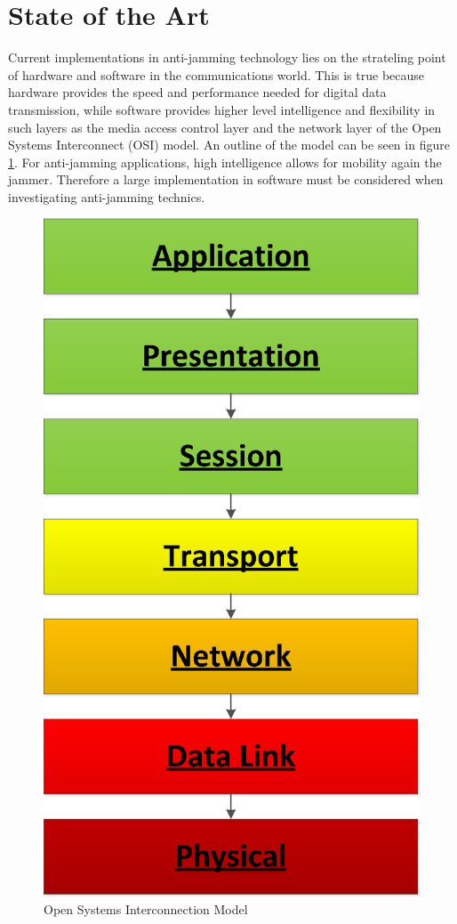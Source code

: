 \section{State of the Art}

Current implementations in anti-jamming technology lies on the strateling point of hardware and software in the communications world.  This is true because hardware provides the speed and performance needed for digital data transmission, while software provides higher level intelligence and flexibility in such layers as the media access control layer and the network layer of the Open Systems Interconnect (OSI) model\cite{Zimmermann}.  An outline of the model can be seen in figure \ref{osi_model}. For anti-jamming applications, high intelligence allows for mobility again the jammer.  Therefore a large implementation in software must be considered when investigating anti-jamming technics.\\

\begin{figure}[!ht]\label{osi_model}
\centering
\includegraphics[scale=0.50]{OSI_model.eps}
\caption{Open Systems Interconnection Model}
\end{figure}

